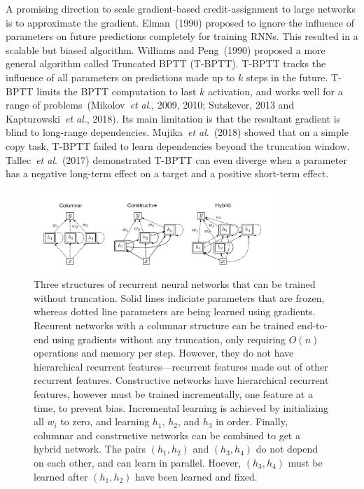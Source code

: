 \documentclass{article}
\newcommand{\etal}{\textit{et al}.}
\begin{document}
 

A promising direction to scale gradient-based credit-assignment to large networks is to approximate the gradient. Elman~(1990) proposed to ignore the influence of parameters on future predictions completely for training RNNs. This resulted in a scalable but biased algorithm. Williams and Peng~(1990) proposed a more general algorithm called Truncated BPTT (T-BPTT). T-BPTT tracks the influence of all parameters on predictions made up to $k$ steps in the future. T-BPTT limits the BPTT computation to last $k$ activation, and works well for a range of problems~(Mikolov~\etal, 2009, 2010; Sutskever, 2013 and Kapturowski~\etal, 2018). Its main limitation is that the resultant gradient is blind to long-range dependencies. Mujika~\etal~(2018) showed that on a simple copy task, T-BPTT failed to learn dependencies beyond the truncation window. Tallec~\etal~(2017) demonstrated T-BPTT can even diverge when a parameter has a negative long-term effect on a target and a positive short-term effect. 

\begin{figure}
	\centering
	\includegraphics[width=0.8\textwidth]{figures/three_types}
	\caption{Three structures of recurrent neural networks that can be trained without truncation. Solid lines indiciate parameters that are frozen, whereas dotted line parameters are being learned using gradients. Recurent networks with a columnar structure can be trained end-to-end using gradients without any truncation, only requiring $O(n)$ operations and memory per step. However, they do not have hierarchical recurrent features---recurrent features made out of other recurrent features. Constructive networks have hierarchical recurrent features, however must be trained incrementally, one feature at a time, to prevent bias. Incremental learning is achieved by initializing all $w_i$ to zero, and learning $h_1$, $h_2$, and $h_3$ in order. Finally, columnar and constructive networks can be combined to get a hybrid network. The pairs $(h_1, h_2)$ and $(h_3, h_4)$ do not depend on each other, and can learn in parallel. Hoever, $(h_3, h_4)$ must be learned after $(h_1, h_2)$ have been learned and fixed.}
\end{figure}
\end{document}
